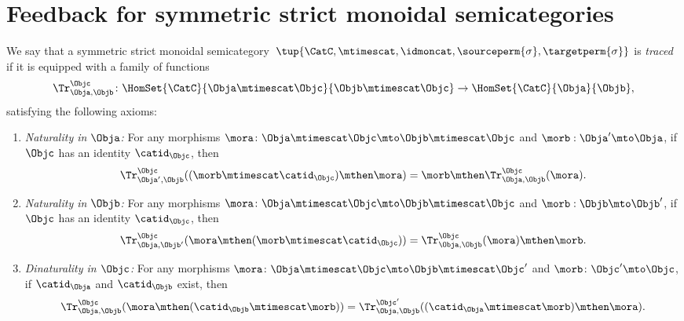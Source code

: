 
\section{Feedback for symmetric strict monoidal semicategories}

\begin{ctdefinition}
    \label{def:traced-fun-stack-scat}
    We say that a symmetric strict monoidal semicategory~$\tup{\CatC,\mtimescat, \idmoncat, \sourceperm{\sigma} , \targetperm{\sigma} }$ is \emph{traced} if it is equipped with a family of functions
    \begin{equation}
        \Tr_{\Obja,\Objb}^\Objc\colon \HomSet{\CatC}{\Obja \mtimescat \Objc}{\Objb\mtimescat \Objc}\to \HomSet{\CatC}{\Obja}{\Objb},
    \end{equation}
    satisfying the following axioms:
    \begin{enumerate}

        \item \emph{Naturality in $\Obja$:} For any morphisms $\mora\colon \Obja\mtimescat \Objc \mto \Objb\mtimescat \Objc$ and $\morb : \Obja' \mto \Obja$, if $\Objc$ has an identity $\catid_\Objc$, then
              \begin{equation}
                  \Tr_{\Obja', \Objb}^\Objc ( (\morb \mtimescat \catid_\Objc) \mthen \mora) = \morb \mthen \Tr_{\Obja, \Objb}^\Objc (\mora).
              \end{equation}

        \item \emph{Naturality in $\Objb$:}
              For any morphisms $\mora\colon \Obja\mtimescat \Objc \mto \Objb\mtimescat \Objc$ and $\morb : \Objb \mto \Objb'$, if $\Objc$ has an identity $\catid_\Objc$, then
              \begin{equation}
                  \Tr_{\Obja, \Objb'}^\Objc ( \mora \mthen (\morb \mtimescat \catid_\Objc) ) =  \Tr_{\Obja, \Objb}^\Objc (\mora) \mthen \morb.
              \end{equation}

        \item \emph{Dinaturality in $\Objc$:}
              For any morphisms $\mora \colon \Obja \mtimescat \Objc \mto \Objb \mtimescat \Objc'$ and $\morb \colon \Objc' \mto \Objc$, if $\catid_\Obja$ and $\catid_\Objb$ exist, then
              \begin{equation}
                  \Tr_{\Obja, \Objb}^{\Objc} (\mora \mthen (\catid_\Objb \mtimescat \morb)) = \Tr_{\Obja, \Objb}^{\Objc'}((\catid_\Obja \mtimescat \morb) \mthen \mora).
              \end{equation}


\end{enumerate}
\end{ctdefinition}
